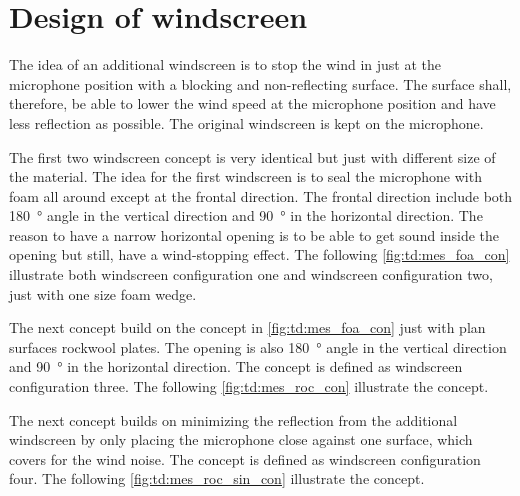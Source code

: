 \chapter{Design of windscreen}\label{ap:desig_screen}
The idea of an additional windscreen is to stop the wind in just at the microphone position with a blocking and non-reflecting surface. The surface shall, therefore, be able to lower the wind speed at the microphone position and have less reflection as possible. The original windscreen is kept on the microphone.

The first two windscreen concept is very identical but just with different size of the material. The idea for the first windscreen is to seal the microphone with foam all around except at the frontal direction. The frontal direction include both \SI{180}{\degree} angle in the vertical direction and \SI{90}{\degree} in the horizontal direction.  The reason to have a narrow horizontal opening is to be able to get sound inside the opening but still, have a wind-stopping effect. The following \autoref{fig:td:mes_foa_con} illustrate both windscreen configuration one and windscreen configuration two, just with one size foam wedge.
    

The next concept build on the concept in \autoref{fig:td:mes_foa_con} just with plan surfaces rockwool plates. The opening is also \SI{180}{\degree} angle in the vertical direction and \SI{90}{\degree} in the horizontal direction. The concept is defined as windscreen configuration three. The following \autoref{fig:td:mes_roc_con} illustrate the concept.

The next concept builds on minimizing the reflection from the additional windscreen by only placing the microphone close against one surface, which covers for the wind noise. The concept is defined as windscreen configuration four. The following \autoref{fig:td:mes_roc_sin_con} illustrate the concept.




